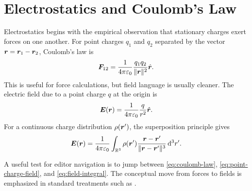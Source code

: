 \begin{abstract}
This document is a deliberately equation-heavy electromagnetism sample for testing a LaTeX editing setup.
It includes cross-references, citations, displayed equations, aligned environments, a bibliography, TikZ figures, tables, labels, and enough page breaks to make forward and inverse SyncTeX testing meaningful.
Compile with \texttt{latexmk -pdf -synctex=1 em-test.tex}. 
For VimTeX, try \texttt{\textbackslash ll} to compile, \texttt{\textbackslash lv} to view, \texttt{\textbackslash le} for errors, and PDF-to-source inverse search in your viewer.
\end{abstract}

\tableofcontents
\newpage

\section{Electrostatics and Coulomb's Law}
\label{sec:electrostatics}

Electrostatics begins with the empirical observation that stationary charges exert forces on one another.
For point charges \(q_1\) and \(q_2\) separated by the vector \(\bm{r} = \bm{r}_1 - \bm{r}_2\), Coulomb's law is
\begin{equation}
  \bm{F}_{12}
  =
  \frac{1}{4\pi\varepsilon_0}
  \frac{q_1 q_2}{\lVert \bm{r} \rVert^2}
  \hat{\bm{r}} .
  \label{eq:coulomb-law}
\end{equation}
This is useful for force calculations, but field language is usually cleaner.
The electric field due to a point charge \(q\) at the origin is
\begin{equation}
  \bm{E}(\bm{r})
  =
  \frac{1}{4\pi\varepsilon_0}
  \frac{q}{r^2}\hat{\bm{r}} .
  \label{eq:point-charge-field}
\end{equation}
For a continuous charge distribution \(\rho(\bm{r}')\), the superposition principle gives
\begin{equation}
  \bm{E}(\bm{r})
  =
  \frac{1}{4\pi\varepsilon_0}
  \int_{\mathbb{R}^3}
  \rho(\bm{r}')
  \frac{\bm{r}-\bm{r}'}{\lVert \bm{r}-\bm{r}' \rVert^3}
  \mathop{}\!\mathrm{d}^3 r' .
  \label{eq:field-integral}
\end{equation}

A useful test for editor navigation is to jump between \cref{eq:coulomb-law}, \cref{eq:point-charge-field}, and \cref{eq:field-integral}.
The conceptual move from forces to fields is emphasized in standard treatments such as \cite{griffiths2017,purcell2013}.


